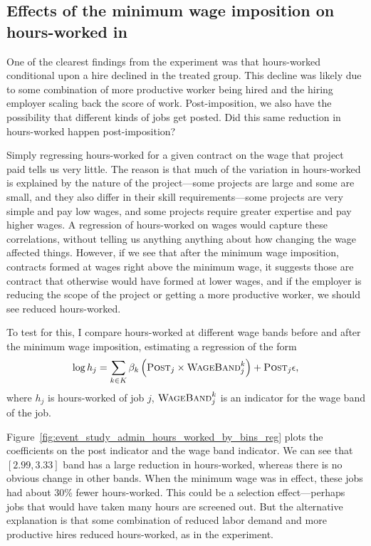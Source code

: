 \subsection{Effects of the minimum wage imposition on hours-worked in \admin{}}
One of the clearest findings from the experiment was that hours-worked conditional upon a hire declined in the treated group.
This decline was likely due to some combination of more productive worker being hired and the hiring employer scaling back the score of work.
Post-imposition, we also have the possibility that different kinds of jobs get posted.
Did this same reduction in hours-worked happen post-imposition? 

Simply regressing hours-worked for a given contract on the wage that project paid tells us very little.
The reason is that much of the variation in hours-worked is explained by the nature of the project---some projects are large and some are small, and they also differ in their skill requirements---some projects are very simple and pay low wages, and some projects require greater expertise and pay higher wages.
A regression of hours-worked on wages would capture these correlations, without telling us anything anything about how changing the wage affected things. 
However, if we see that after the minimum wage imposition, contracts formed at wages right above the minimum wage, it suggests those are contract that otherwise would have formed at lower wages, and if the employer is reducing the scope of the project or getting a more productive worker, we should see reduced hours-worked.

To test for this, I compare hours-worked at different wage bands before and after the minimum wage imposition, estimating a regression of the form 
\begin{align} \label{eq:hours_worked} 
  \log h_{j} = \sum_{k \in K} \beta_k \left( \textsc{Post}_{j} \times \textsc{WageBand}^k_{j} \right) + \textsc{Post}_{j}
  \epsilon,
\end{align}
where $h_j$ is hours-worked of job $j$, $\textsc{WageBand}^k_j$ is an indicator for the wage band of the job.

Figure~\ref{fig:event_study_admin_hours_worked_by_bins_reg} plots the coefficients on the post indicator and the wage band indicator. 
We can see that $[2.99,3.33]$ band has a large reduction in hours-worked, whereas there is no obvious change in other bands.
When the minimum wage was in effect, these jobs had about 30\% fewer hours-worked.
This could be a selection effect---perhaps jobs that would have taken many hours are screened out.
But the alternative explanation is that some combination of reduced labor demand and more productive hires reduced hours-worked, as in the experiment.


